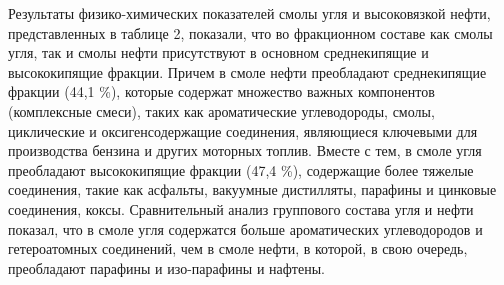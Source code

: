 
Результаты физико-химических показателей смолы угля и высоковязкой
нефти, представленных в таблице 2, показали, что во фракционном составе
как смолы угля, так и смолы нефти присутствуют в основном среднекипящие
и высококипящие фракции. Причем в смоле нефти преобладают среднекипящие
фракции (44,1 \%), которые содержат множество важных компонентов
(комплексные смеси), таких как ароматические углеводороды, смолы,
циклические и оксигенсодержащие соединения, являющиеся ключевыми для
производства бензина и других моторных топлив. Вместе с тем, в смоле
угля преобладают высококипящие фракции (47,4 \%), содержащие более
тяжелые соединения, такие как асфальты, вакуумные дистилляты, парафины и
цинковые соединения, коксы. Сравнительный анализ группового состава угля
и нефти показал, что в смоле угля содержатся больше ароматических
углеводородов и гетероатомных соединений, чем в смоле нефти, в которой,
в свою очередь, преобладают парафины и изо-парафины и нафтены.


